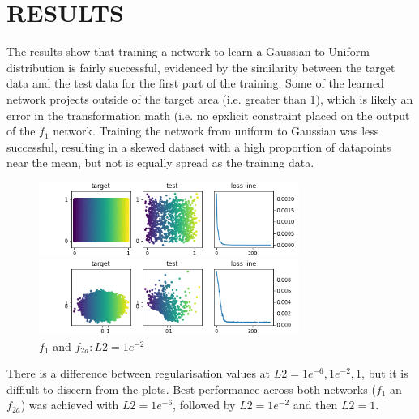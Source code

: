\documentclass{article}
\begin{document}
\section{RESULTS}
\label{sec:results}
%
The results show that training a network to learn a Gaussian to Uniform distribution is fairly successful, evidenced by the similarity between the target data and the test data for the first part of the training.  Some of the learned network projects outside of the target area (i.e. greater than 1), which is likely an error in the transformation math (i.e. no epxlicit constraint placed on the output of the $f_1$ network.  Training the network from uniform to Gaussian was less successful, resulting in a skewed dataset with a high proportion of datapoints near the mean, but not is equally spread as the training data.  


\begin{figure}[htb]

\begin{minipage}[b]{1\linewidth}
  \centering
  \centerline{\includegraphics[width=8.5cm]{f1_0.01_300_1000}}
\end{minipage}
\begin{minipage}[b]{1\linewidth}
  \centering
  \centerline{\includegraphics[width=8.5cm]{f2a_0.01_300_1000}}
\end{minipage}
%
\caption{$f_1$ and $f_{2a}: L2 = 1e^{-2}$}
\label{fig:res}
%
\end{figure}

There is a difference between regularisation values at $L2 = {1e^{-6}, 1e^{-2}, 1}$, but it is diffiult to discern from the plots.  Best performance across both networks ($f_1$ an $f_{2a}$) was achieved with $L2 = 1e^{-6}$, followed by $L2 = 1e^{-2}$ and then $L2 = 1$.  
\end{document}
